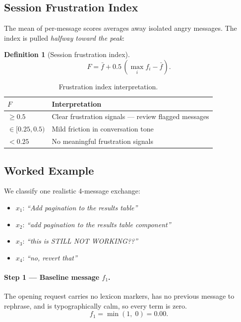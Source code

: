 \documentclass[11pt,a4paper]{article}
\newtheorem{definition}{Definition}
\begin{document}
\subsection{Session Frustration Index}

The mean of per-message scores averages away isolated angry messages.
The index is pulled \emph{halfway toward the peak}:

\begin{definition}[Session frustration index]
\[
  \boxed{F = \bar{f} + 0.5\,\left(\max_i f_i - \bar{f}\right).}
\]
\end{definition}

\begin{table}[h!]
\centering
\caption{Frustration index interpretation.}
\begin{tabular}{@{}ll@{}}
\toprule
$F$ & Interpretation \\
\midrule
$\geq 0.5$ & Clear frustration signals --- review flagged messages \\
$\in [0.25, 0.5)$ & Mild friction in conversation tone \\
$< 0.25$ & No meaningful frustration signals \\
\bottomrule
\end{tabular}
\end{table}

\subsection{Worked Example}
\label{sec:frustration-example}

We classify one realistic 4-message exchange:
\begin{itemize}
  \item $x_1$: \textit{``Add pagination to the results table''}
  \item $x_2$: \textit{``add pagination to the results table component''}
  \item $x_3$: \textit{``this is STILL NOT WORKING??''}
  \item $x_4$: \textit{``no, revert that''}
\end{itemize}

\paragraph{Step 1 --- Baseline message $f_1$.}
The opening request carries no lexicon markers, has no previous message
to rephrase, and is typographically calm, so every term is zero.
\[
  f_1 = \min(1,\; 0) = 0.00.
\]
\end{document}
